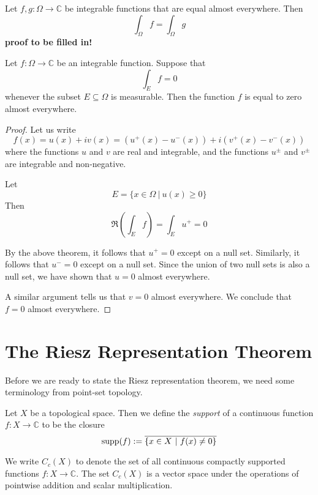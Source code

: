 \begin{corollary}
Let $f,g\colon \Omega \rightarrow {\mathbb C}$ be integrable functions that are equal almost everywhere.  Then
$$\int_\Omega f = \int_\Omega g$$
\textbf{proof to be filled in!}
\end{corollary}

\begin{corollary}
Let $f\colon \Omega \rightarrow {\mathbb C}$ be an integrable function.  Suppose that
$$\int_E f =0$$
whenever the subset $E\subseteq \Omega$ is measurable.  Then the function $f$ is equal to zero almost everywhere.
\end{corollary}

\begin{proof}
Let us write
$$f(x) = u(x) + iv(x) = (u^+(x)- u^- (x)) + i(v^+(x) - v^-(x))$$
where the functions $u$ and $v$ are real and integrable, and the functions $u^\pm$ and $v^\pm$ are integrable and non-negative.

Let
$$E = \{ x\in \Omega \ |\ u(x)\geq 0 \}$$
Then
$$\Re \left( \int_E f \right) = \int_E u^+ =0$$

By the above theorem, it follows that $u^+ =0$ except on a null set.  Similarly, it follows that $u^- =0$ except on a null set.  Since the union of two null sets is also a null set, we have shown that $u=0$ almost everywhere.

A similar argument tells us that $v=0$ almost everywhere.  We conclude that $f=0$ almost everywhere.
\end{proof}

\section{The Riesz Representation Theorem}

Before we are ready to state the Riesz representation theorem, we need some terminology from point-set topology.

\begin{definition}
Let $X$ be a topological space.  Then we define the {\em support} of a continuous function $f\colon X\rightarrow {\mathbb C}$ to be the closure
$$\operatorname{supp} (f):= \overline{ \{ x\in X \ |\ f(x)\neq 0 \} }$$
\end{definition}

We write $C_c (X)$ to denote the set of all continuous compactly supported functions $f\colon X\rightarrow {\mathbb C}$.  The set $C_c (X)$ is a vector space under the operations of pointwise addition and scalar multiplication.

